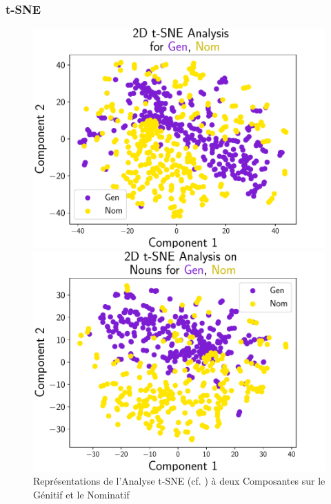 \documentclass[noamsthm]{beamercours}
\begin{document}
\begin{frame}
	\frametitle{t-SNE}\label{subsub:tsne}
	\begin{figure}
	\begin{minipage}{.45\textwidth}
		\begin{center}
			\includegraphics[width=\linewidth]{Figures/Visualisations/tsne_Gen_Nom.pdf}
		\end{center}
	\end{minipage}
	\begin{minipage}{.45\textwidth}
		\begin{center}
			\includegraphics[width=\linewidth]{Figures/Visualisations/tsne_Gen_Nom_Nouns.pdf}
		\end{center}
	\end{minipage}
	\caption{Représentations de l'Analyse t-SNE (cf. \cite{tSNE}) à deux Composantes sur le Génitif et le Nominatif}
	\label{fig_tsne}
	\end{figure}
\end{frame}
\end{document}
